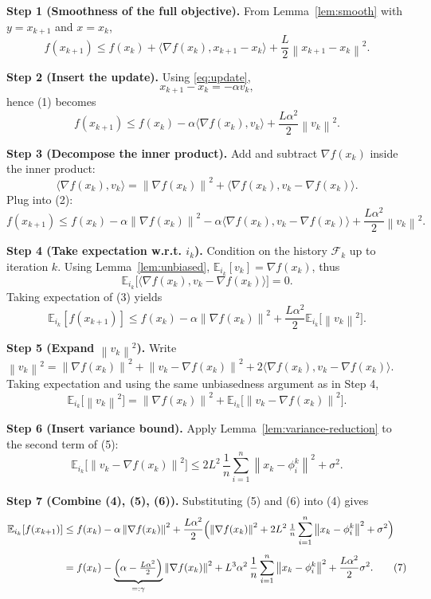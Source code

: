 \documentclass{article}
\newcommand{\E}{\mathbb{E}}
\newcommand{\norm}[1]{\left\|#1\right\|}
\newcommand{\grad}{\nabla}
\begin{document}
\noindent\textbf{Step 1 (Smoothness of the full objective).}  
From Lemma~\ref{lem:smooth} with $y=x_{k+1}$ and $x=x_k$,
\[
f(x_{k+1})\le f(x_k)+\langle\grad f(x_k),x_{k+1}-x_k\rangle
+\frac{L}{2}\norm{x_{k+1}-x_k}^{2}. \tag{1}
\]

\noindent\textbf{Step 2 (Insert the update).}  
Using \eqref{eq:update},
\[
x_{k+1}-x_k=-\alpha v_k,
\]
hence (1) becomes
\[
f(x_{k+1})\le f(x_k)-\alpha\langle\grad f(x_k),v_k\rangle
+\frac{L\alpha^{2}}{2}\norm{v_k}^{2}. \tag{2}
\]

\noindent\textbf{Step 3 (Decompose the inner product).}  
Add and subtract $\grad f(x_k)$ inside the inner product:
\[
\langle\grad f(x_k),v_k\rangle
= \norm{\grad f(x_k)}^{2}
+ \langle\grad f(x_k),v_k-\grad f(x_k)\rangle.
\]
Plug into (2):
\[
f(x_{k+1})\le f(x_k)-\alpha\norm{\grad f(x_k)}^{2}
-\alpha\langle\grad f(x_k),v_k-\grad f(x_k)\rangle
+\frac{L\alpha^{2}}{2}\norm{v_k}^{2}. \tag{3}
\]

\noindent\textbf{Step 4 (Take expectation w.r.t. $i_k$).}  
Condition on the history $\mathcal{F}_k$ up to iteration $k$.
Using Lemma~\ref{lem:unbiased}, $\E_{i_k}[v_k]=\grad f(x_k)$, thus
\[
\E_{i_k}\!\bigl[\langle\grad f(x_k),v_k-\grad f(x_k)\rangle\bigr]=0.
\]
Taking expectation of (3) yields
\[
\E_{i_k}[f(x_{k+1})]\le f(x_k)-\alpha\norm{\grad f(x_k)}^{2}
+\frac{L\alpha^{2}}{2}\E_{i_k}\!\bigl[\norm{v_k}^{2}\bigr]. \tag{4}
\]

\noindent\textbf{Step 5 (Expand $\norm{v_k}^{2}$).}  
Write $\norm{v_k}^{2}
=\norm{\grad f(x_k)}^{2}
+ \norm{v_k-\grad f(x_k)}^{2}
+2\langle\grad f(x_k),v_k-\grad f(x_k)\rangle$.
Taking expectation and using the same unbiasedness argument as in Step 4,
\[
\E_{i_k}\!\bigl[\norm{v_k}^{2}\bigr]
= \norm{\grad f(x_k)}^{2}
+ \E_{i_k}\!\bigl[\norm{v_k-\grad f(x_k)}^{2}\bigr]. \tag{5}
\]

\noindent\textbf{Step 6 (Insert variance bound).}  
Apply Lemma~\ref{lem:variance-reduction} to the second term of (5):
\[
\E_{i_k}\!\bigl[\norm{v_k-\grad f(x_k)}^{2}\bigr]
\le 2L^{2}\,\frac{1}{n}\sum_{i=1}^{n}\norm{x_k-\phi_i^{k}}^{2}
+\sigma^{2}. \tag{6}
\]

\noindent\textbf{Step 7 (Combine (4), (5), (6)).}  
Substituting (5) and (6) into (4) gives
\[
\begin{aligned}
\E_{i_k}[f(x_{k+1})]
&\le f(x_k)-\alpha\norm{\grad f(x_k)}^{2}
+\frac{L\alpha^{2}}{2}\Bigl(\norm{\grad f(x_k)}^{2}
+2L^{2}\,\tfrac{1}{n}\sum_{i=1}^{n}\norm{x_k-\phi_i^{k}}^{2}
+\sigma^{2}\Bigr)\\[1ex]
&= f(x_k)-\underbrace{\Bigl(\alpha-\tfrac{L\alpha^{2}}{2}\Bigr)}_{=: \gamma}
\norm{\grad f(x_k)}^{2}
+L^{3}\alpha^{2}\,\frac{1}{n}\sum_{i=1}^{n}\norm{x_k-\phi_i^{k}}^{2}
+\frac{L\alpha^{2}}{2}\sigma^{2}. \tag{7}
\end{aligned}
\]
\end{document}

